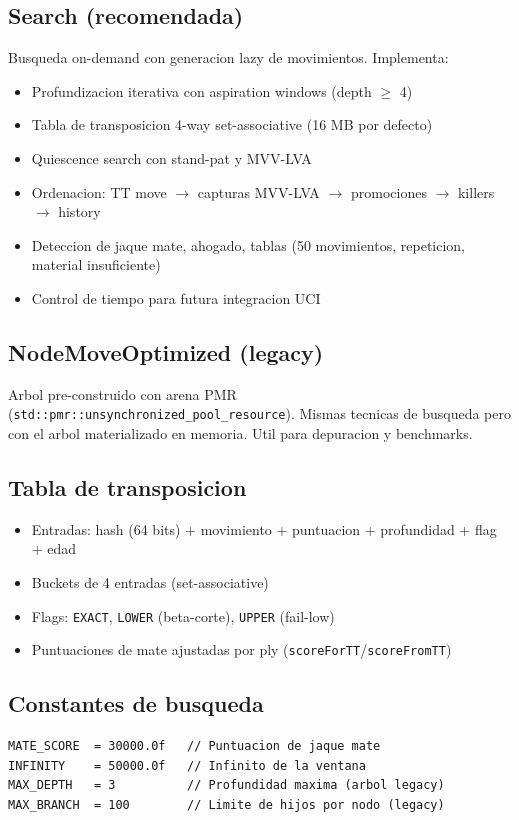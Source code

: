 \documentclass[11pt,a4paper]{article}
\begin{document}
\subsection*{Search (recomendada)}
Busqueda on-demand con generacion lazy de movimientos. Implementa:
\begin{itemize}
  \item Profundizacion iterativa con aspiration windows (depth $\geq$ 4)
  \item Tabla de transposicion 4-way set-associative (16 MB por defecto)
  \item Quiescence search con stand-pat y MVV-LVA
  \item Ordenacion: TT move $\to$ capturas MVV-LVA $\to$ promociones $\to$ killers $\to$ history
  \item Deteccion de jaque mate, ahogado, tablas (50 movimientos, repeticion, material insuficiente)
  \item Control de tiempo para futura integracion UCI
\end{itemize}

\subsection*{NodeMoveOptimized (legacy)}
Arbol pre-construido con arena PMR (\texttt{std::pmr::unsynchronized\_pool\_resource}).
Mismas tecnicas de busqueda pero con el arbol materializado en memoria.
Util para depuracion y benchmarks.

\subsection*{Tabla de transposicion}
\begin{itemize}
  \item Entradas: hash (64 bits) + movimiento + puntuacion + profundidad + flag + edad
  \item Buckets de 4 entradas (set-associative)
  \item Flags: \texttt{EXACT}, \texttt{LOWER} (beta-corte), \texttt{UPPER} (fail-low)
  \item Puntuaciones de mate ajustadas por ply (\texttt{scoreForTT}/\texttt{scoreFromTT})
\end{itemize}

\subsection*{Constantes de busqueda}
\begin{verbatim}
MATE_SCORE  = 30000.0f   // Puntuacion de jaque mate
INFINITY    = 50000.0f   // Infinito de la ventana
MAX_DEPTH   = 3          // Profundidad maxima (arbol legacy)
MAX_BRANCH  = 100        // Limite de hijos por nodo (legacy)
\end{verbatim}
\end{document}
